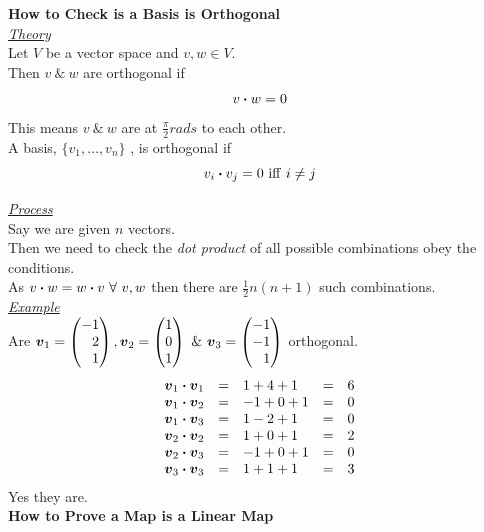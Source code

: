 \documentclass[11pt,a4paper]{article}
\begin{document}
\textbf{How to Check is a Basis is Orthogonal}\\

\underline{\textit{Theory}}\\
Let $V$ be a vector space and $v, w \in V$.\\
Then $v\ \&\ w$ are orthogonal if
$$v \boldsymbol{\cdot} w = 0$$
This means $v\ \&\ w$ are at $\frac{\pi}{2}rads$ to each other.\\
A basis, $\{v_1, \dots, v_n\}$ , is orthogonal if
$$v_i \boldsymbol{\cdot} v_j = 0\mathrm{\ iff\ } i \neq j$$

\underline{\textit{Process}}\\
Say we are given $n$ vectors.\\
Then we need to check the \textit{dot product} of all possible combinations obey the conditions.\\
As $v \boldsymbol{\cdot} w = w \boldsymbol{\cdot} v\ \forall\ v, w$ then there are $\frac{1}{2}n(n+1)$ such combinations.\\

\underline{\textit{Example}}\\
Are $\vect{v}_1 = \begin{pmatrix*}[r] -1 \\ 2 \\1 \end{pmatrix*}, \vect{v}_2 = \begin{pmatrix} 1 \\ 0 \\ 1 \end{pmatrix}\ \&\ \vect{v}_3 = \begin{pmatrix*}[r] -1 \\ -1 \\ 1\end{pmatrix*}$ orthogonal.
\[\begin{array}{rclcl}
  \boldsymbol{v}_1 \boldsymbol{\cdot} \boldsymbol{v}_1 &=& 1 + 4 + 1 &=& 6\\
  \boldsymbol{v}_1 \boldsymbol{\cdot} \boldsymbol{v}_2 &=& -1 + 0 + 1 &=& 0\\
  \boldsymbol{v}_1 \boldsymbol{\cdot} \boldsymbol{v}_3 &=& 1 -2 + 1 &=& 0\\
  \boldsymbol{v}_2 \boldsymbol{\cdot} \boldsymbol{v}_2 &=& 1 + 0 + 1 &=& 2\\
  \boldsymbol{v}_2 \boldsymbol{\cdot} \boldsymbol{v}_3 &=& -1 + 0 + 1 &=& 0\\
  \boldsymbol{v}_3 \boldsymbol{\cdot} \boldsymbol{v}_3 &=& 1 + 1 + 1 &=& 3
\end{array}\]
Yes they are.\\

\newpage\textbf{How to Prove a Map is a Linear Map}\\
\end{document}

